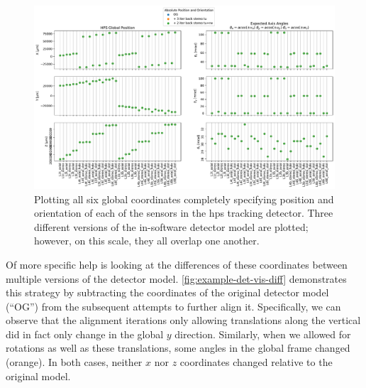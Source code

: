 \begin{figure}
  \centering
  \includegraphics[width=\textwidth]{figures/hps/alignment/example-det-vis-abs.pdf}
  \caption{Plotting all six global coordinates completely specifying position and orientation
    of each of the sensors in the \ac{hps} tracking detector. Three different versions of the
    in-software detector model are plotted; however, on this scale, they all overlap one another.}
  \label{fig:example-det-vis-abs}
\end{figure}

Of more specific help is looking at the differences of these coordinates between multiple versions
of the detector model. \cref{fig:example-det-vis-diff} demonstrates this strategy by subtracting
the coordinates of the original detector model (``OG'') from the subsequent attempts to further
align it. Specifically, we can observe that the alignment iterations only allowing translations
along the vertical did in fact only change in the global $y$ direction. Similarly, when we allowed
for rotations as well as these translations, some angles in the global frame changed (orange). In
both cases, neither $x$ nor $z$ coordinates changed relative to the original model.

